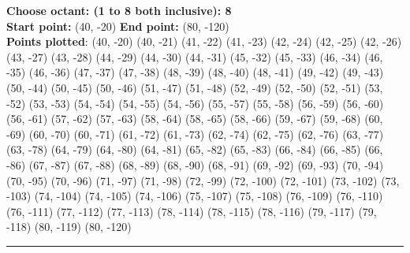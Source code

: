\documentclass[12pt,letterpaper]{article}
\begin{document}
\textbf{Choose octant: (1 to 8 both inclusive): 8}\\
\textbf{Start point:} (40, -20)
\textbf{End point:} (80, -120)\\
\textbf{Points plotted}: 
(40, -20) (40, -21) (41, -22) (41, -23) 
(42, -24) (42, -25) (42, -26) (43, -27) 
(43, -28) (44, -29) (44, -30) (44, -31) 
(45, -32) (45, -33) (46, -34) (46, -35) 
(46, -36) (47, -37) (47, -38) (48, -39) 
(48, -40) (48, -41) (49, -42) (49, -43) 
(50, -44) (50, -45) (50, -46) (51, -47) 
(51, -48) (52, -49) (52, -50) (52, -51) 
(53, -52) (53, -53) (54, -54) (54, -55) 
(54, -56) (55, -57) (55, -58) (56, -59) 
(56, -60) (56, -61) (57, -62) (57, -63) 
(58, -64) (58, -65) (58, -66) (59, -67) 
(59, -68) (60, -69) (60, -70) (60, -71) 
(61, -72) (61, -73) (62, -74) (62, -75) 
(62, -76) (63, -77) (63, -78) (64, -79) 
(64, -80) (64, -81) (65, -82) (65, -83) 
(66, -84) (66, -85) (66, -86) (67, -87) 
(67, -88) (68, -89) (68, -90) (68, -91) 
(69, -92) (69, -93) (70, -94) (70, -95) 
(70, -96) (71, -97) (71, -98) (72, -99) 
(72, -100) (72, -101) (73, -102) (73, -103) 
(74, -104) (74, -105) (74, -106) (75, -107) 
(75, -108) (76, -109) (76, -110) (76, -111) 
(77, -112) (77, -113) (78, -114) (78, -115) 
(78, -116) (79, -117) (79, -118) (80, -119) 
(80, -120)

\bigskip\bigskip
\hrule
\end{document}
